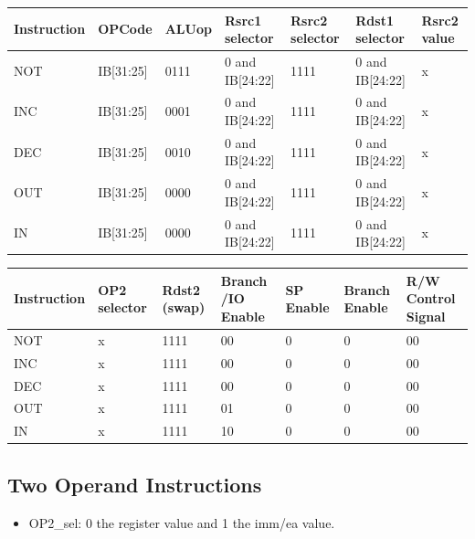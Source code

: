 \documentclass[12pt]{report}
\begin{document}
\begin{center}
\begin{tabular}{||p{20mm}| p{15mm}| p{15mm}| p{15mm}| p{15mm}| p{15mm}| p{15mm}||} 
\hline
Instruction & OPCode & ALUop & Rsrc1 selector & Rsrc2 selector & Rdst1 selector & Rsrc2 value \\ [0.5ex] 
\hline\hline
NOT & IB[31:25] & 0111 & 0 and IB[24:22] & 1111 & 0 and IB[24:22] & x  \\
\hline
INC & IB[31:25] & 0001 & 0 and IB[24:22] & 1111 & 0 and IB[24:22] & x \\
\hline
DEC & IB[31:25] & 0010 & 0 and IB[24:22] & 1111 & 0 and IB[24:22] & x \\
\hline
OUT & IB[31:25] & 0000 & 0 and IB[24:22] & 1111 & 0 and IB[24:22] & x \\
\hline
IN  & IB[31:25] & 0000 & 0 and IB[24:22] & 1111 & 0 and IB[24:22] & x \\
\hline
\end{tabular}
\end{center}

\begin{center}
\begin{tabular}{||p{20mm}| p{15mm}| p{15mm}| p{15mm}| p{15mm}| p{15mm}| p{15mm}||} 
\hline
Instruction & OP2 selector & Rdst2 (swap) & Branch /IO Enable & SP Enable & Branch Enable & R/W Control Signal \\ [0.5ex] 
\hline\hline
NOT & x & 1111 & 00 & 0 & 0 & 00 \\
\hline
INC & x & 1111 & 00 & 0 & 0 & 00 \\
\hline
DEC & x & 1111 & 00 & 0 & 0 & 00 \\
\hline
OUT & x & 1111 & 01 & 0 & 0 & 00 \\
\hline
IN  & x & 1111 & 10 & 0 & 0 & 00 \\
\hline
\end{tabular}
\end{center}

\subsection{Two Operand Instructions}
\begin{itemize}
    \item OP2\_sel: 0 the register value and 1 the imm/ea value.
\end{itemize}
\end{document}
